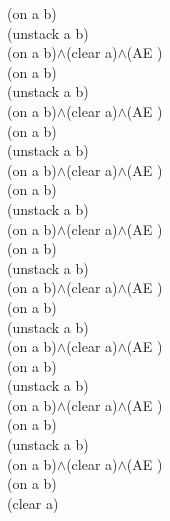 {{(on a b)\\
(unstack a b)\\
(on a b)$\wedge$(clear a)$\wedge$(AE )\\
(on a b)\\
(unstack a b)\\
(on a b)$\wedge$(clear a)$\wedge$(AE )\\
(on a b)\\
(unstack a b)\\
(on a b)$\wedge$(clear a)$\wedge$(AE )\\
(on a b)\\
(unstack a b)\\
(on a b)$\wedge$(clear a)$\wedge$(AE )\\
(on a b)\\
(unstack a b)\\
(on a b)$\wedge$(clear a)$\wedge$(AE )\\
(on a b)\\
(unstack a b)\\
(on a b)$\wedge$(clear a)$\wedge$(AE )\\
(on a b)\\
(unstack a b)\\
(on a b)$\wedge$(clear a)$\wedge$(AE )\\
(on a b)\\
(unstack a b)\\
(on a b)$\wedge$(clear a)$\wedge$(AE )\\
(on a b)\\
(clear a)\\
}%
}


